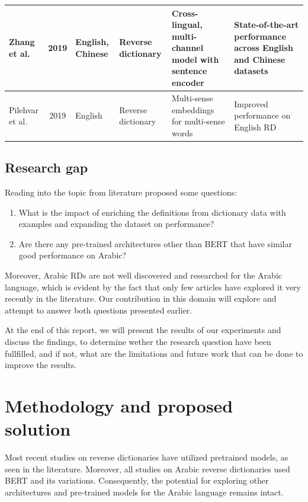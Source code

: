 \documentclass[12.5pt]{article}
\begin{document}
\begin{table}
\begin{tabularx}{\textwidth}{|l|c|L{0.4}|L{1}|L{1.4}|L{1.2}|}
        \hline
        Zhang et al. \cite{Zhang2019} & 2019 & English, Chinese & Reverse dictionary & Cross-lingual, multi-channel model with sentence encoder & State-of-the-art performance across English and Chinese datasets \\
        \hline
        Pilehvar et al. \cite{Pilehvar2019} & 2019 & English & Reverse dictionary & Multi-sense embeddings for multi-sense words & Improved performance on English RD \\
        \hline
    \end{tabularx}
\end{table}

\subsection{Research gap}

Reading into the topic from literature proposed some questions:
\begin{enumerate}
    \item What is the impact of enriching the definitions from dictionary data with examples and expanding the dataset on performance?
    \item Are there any pre-trained architectures other than BERT that have similar good performance on Arabic?
\end{enumerate}

Moreover, Arabic RDs are not well discovered and researched for the Arabic language, which is evident by the fact that only few articles have explored it very recently in the literature. Our contribution in this domain will explore and attempt to answer both questions presented earlier.

At the end of this report, we will present the results of our experiments and discuss the findings, to determine wether the research question have been fullfilled, and if not, what are the limitations and future work that can be done to improve the results.

\newpage

\section{Methodology and proposed solution}

Most recent studies on reverse dictionaries have utilized pretrained models, as seen in the literature. Moreover, all studies on Arabic reverse dictionaries used BERT and its variations. Consequently, the potential for exploring other architectures and pre-trained models for the Arabic language remains intact. 
\end{document}

